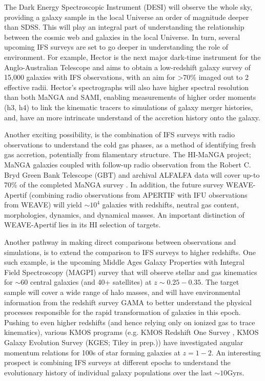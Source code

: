 The Dark Energy Spectroscopic Instrument (DESI) will observe the whole sky, providing a galaxy sample in the local Universe an order of magnitude deeper than SDSS. This will play an integral part of understanding the relationship between the cosmic web and galaxies in the local Universe. In turn, several upcoming IFS surveys are set to go deeper in understanding the role of environment. For example, Hector is the next major dark-time instrument for the Anglo-Australian Telescope and aims to obtain a low-redshift galaxy survey of 15,000 galaxies with IFS observations, with an aim for >70\% imaged out to 2 effective radii. Hector's spectrographs will also have higher spectral resolution than both MaNGA and SAMI, enabling measurements of higher order moments (h3, h4) to link the kinematic tracers to simulations of galaxy merger histories, and, have an more intrincate understand of the accretion history onto the galaxy. 

Another exciting possibility, is the combination of IFS surveys with radio observations to understand the cold gas phases, as a method of identifying fresh gas accretion, potentially from filamentary structure. The HI-MaNGA project; MaNGA galaxies coupled with follow-up radio observation from the Robert C. Bryd Green Bank Telescope (GBT) and archival ALFALFA data will cover up-to 70\% of the completed MaNGA survey \citet{himanga}. In addition, the future survey WEAVE-Apertif (combining radio observations from APERTIF with IFU observations from WEAVE) will yield $\sim10^4$ galaxies with redshifts, neutral gas content, morphologies, dynamics, and dynamical masses. An important distinction of WEAVE-Apertif lies in its HI selection of targets. 

Another pathway in making direct comparisons between observations and simulations, is to extend the comparison to IFS surveys to higher redshifts. One such example, is the upcoming Middle Ages Galaxy Properties with Integral Field Spectroscopy (MAGPI) survey that will observe stellar and gas kinematics for $\sim 60$ central galaxies (and 40+ satellites) at $z\sim0.25-0.35$. The target sample will cover a wide range of halo masses, and will have environmental information from the redshift survey GAMA to better understand the physical processes responsible for the rapid transformation of galaxies in this epoch. Pushing to even higher redshifts (and hence relying only on ionized gas to trace kinematics), various KMOS programs (e.g. KMOS Redshift One Survey \citep[KROSS;][]{stott2016}, KMOS Galaxy Evolution Survey (KGES; Tiley in prep.)) have investigated angular momentum relations for 100s of star forming galaxies at $z=1-2$. An interesting prospect is combining IFS surveys at different epochs \citep[e.g.][]{tiley2019} to understand the evolutionary history of individual galaxy populations over the last $\sim10$Gyrs. 

